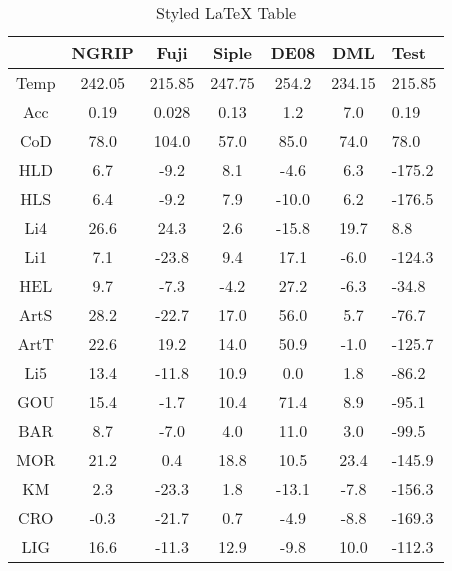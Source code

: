 \begin{table}[h]
\centering
\caption{Styled LaTeX Table}
\label{table:5}
\begin{tabular}{cccccc}
\toprule
 & NGRIP & Fuji & Siple & DE08 & DML & Test \\
\midrule
Temp & 242.05 & 215.85 & 247.75 & 254.2 & 234.15 & 215.85 \\
Acc & 0.19 & 0.028 & 0.13 & 1.2 & 7.0 & 0.19 \\
CoD & 78.0 & 104.0 & 57.0 & 85.0 & 74.0 & 78.0 \\
HLD & 6.7 & -9.2 & 8.1 & -4.6 & 6.3 & -175.2 \\
HLS & 6.4 & -9.2 & 7.9 & -10.0 & 6.2 & -176.5 \\
Li4 & 26.6 & 24.3 & 2.6 & -15.8 & 19.7 & 8.8 \\
Li1 & 7.1 & -23.8 & 9.4 & 17.1 & -6.0 & -124.3 \\
HEL & 9.7 & -7.3 & -4.2 & 27.2 & -6.3 & -34.8 \\
ArtS & 28.2 & -22.7 & 17.0 & 56.0 & 5.7 & -76.7 \\
ArtT & 22.6 & 19.2 & 14.0 & 50.9 & -1.0 & -125.7 \\
Li5 & 13.4 & -11.8 & 10.9 & 0.0 & 1.8 & -86.2 \\
GOU & 15.4 & -1.7 & 10.4 & 71.4 & 8.9 & -95.1 \\
BAR & 8.7 & -7.0 & 4.0 & 11.0 & 3.0 & -99.5 \\
MOR & 21.2 & 0.4 & 18.8 & 10.5 & 23.4 & -145.9 \\
KM & 2.3 & -23.3 & 1.8 & -13.1 & -7.8 & -156.3 \\
CRO & -0.3 & -21.7 & 0.7 & -4.9 & -8.8 & -169.3 \\
LIG & 16.6 & -11.3 & 12.9 & -9.8 & 10.0 & -112.3 \\
\bottomrule
\end{tabular}
\end{table}
